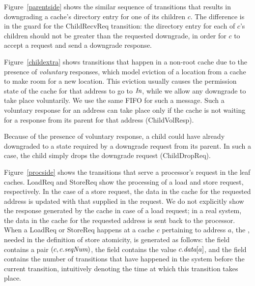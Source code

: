 Figure~\ref{parentside} shows the similar sequence of transitions that results
in downgrading a cache's directory entry for one of its children $c$. The
difference is in the guard for the ChildRecvReq transition: the directory entry for
each of $c$'s children should not be greater than the requested
downgrade, in order for $c$ to accept a request and send a downgrade
response.

Figure~\ref{childextra} shows transitions that happen in a non-root cache due
to the presence of \emph{voluntary} responses, which model eviction of a
location from a cache to make room for a new location. This eviction usually
causes the permission state of the cache for that address to go to $\textit{In}$, while
we allow any downgrade to take place voluntarily.  We use the same \cpResp{}
FIFO for such a message. Such a voluntary response for an address can take
place only if the cache is not waiting for a response from its parent for that
address (ChildVolResp).

Because of the presence of voluntary response, a child could have already
downgraded to a state required by a downgrade request from its parent. In such
a case, the child simply drops the downgrade request (ChildDropReq).

Figure~\ref{procside} shows the transitions that serve a processor's request in
the leaf caches. LoadReq and StoreReq show the processing of a load and store
request, respectively. In the case of a store request, the data in the cache
for the requested address is updated with that supplied in the request. We do
not explicitly show the response generated by the cache in case of a load
request; in a real system, the data in the cache for the requested address is
sent back to the processor. When a LoadReq or StoreReq happens at a cache $c$
pertaining to address $a$, the \Response{}, needed in the definition of store
atomicity, is generated as follows: the  field contains a pair $(c, c.\textit{seqNum})$,
the \dataR{} field contains the value $c.\textit{data}[a]$, and the \timeR{} field
contains the number of transitions that have happened in the system before
the current transition, intuitively denoting the time at which this transition
takes place.


